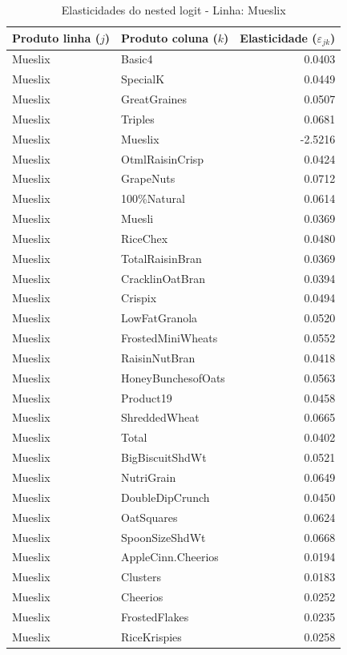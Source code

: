 \begingroup
\begin{table}[H]
\centering
\caption{Elasticidades do nested logit - Linha: Mueslix}
\label{tab:elas-nested-mueslix}
\small
\begin{tabular}{llr}
\toprule
Produto linha ($j$) & Produto coluna ($k$) & Elasticidade ($\varepsilon_{jk}$) \\
\midrule
Mueslix & Basic4 & 0.0403 \\
Mueslix & SpecialK & 0.0449 \\
Mueslix & GreatGraines & 0.0507 \\
Mueslix & Triples & 0.0681 \\
Mueslix & Mueslix & -2.5216 \\
Mueslix & OtmlRaisinCrisp & 0.0424 \\
Mueslix & GrapeNuts & 0.0712 \\
Mueslix & 100\%Natural & 0.0614 \\
Mueslix & Muesli & 0.0369 \\
Mueslix & RiceChex & 0.0480 \\
Mueslix & TotalRaisinBran & 0.0369 \\
Mueslix & CracklinOatBran & 0.0394 \\
Mueslix & Crispix & 0.0494 \\
Mueslix & LowFatGranola & 0.0520 \\
Mueslix & FrostedMiniWheats & 0.0552 \\
Mueslix & RaisinNutBran & 0.0418 \\
Mueslix & HoneyBunchesofOats & 0.0563 \\
Mueslix & Product19 & 0.0458 \\
Mueslix & ShreddedWheat & 0.0665 \\
Mueslix & Total & 0.0402 \\
Mueslix & BigBiscuitShdWt & 0.0521 \\
Mueslix & NutriGrain & 0.0649 \\
Mueslix & DoubleDipCrunch & 0.0450 \\
Mueslix & OatSquares & 0.0624 \\
Mueslix & SpoonSizeShdWt & 0.0668 \\
Mueslix & AppleCinn.Cheerios & 0.0194 \\
Mueslix & Clusters & 0.0183 \\
Mueslix & Cheerios & 0.0252 \\
Mueslix & FrostedFlakes & 0.0235 \\
Mueslix & RiceKrispies & 0.0258 \\

\end{tabular}
\end{table}
